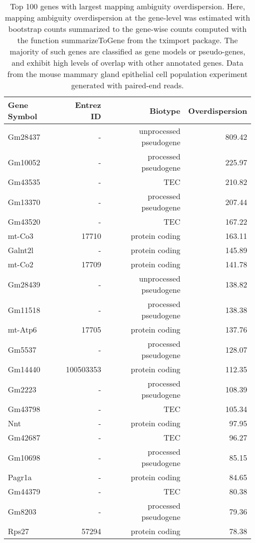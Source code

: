 \begingroup\fontsize{10}{12}\selectfont

\begin{longtable}[t]{lrrr}
\caption{Top 100 genes with largest mapping ambiguity overdispersion. Here, mapping ambiguity overdispersion at the gene-level was estimated with bootstrap counts summarized to the gene-wise counts computed with the function summarizeToGene from the tximport package. The majority of such genes are classified as gene models or pseudo-genes, and exhibit high levels of overlap with other annotated genes. Data from the mouse mammary gland epithelial cell population experiment generated with paired-end reads.}\\
\toprule
Gene Symbol & Entrez ID & Biotype & Overdispersion\\
\midrule
Gm28437 & - & unprocessed pseudogene & 809.42\\
Gm10052 & - & processed pseudogene & 225.97\\
Gm43535 & - & TEC & 210.82\\
Gm13370 & - & processed pseudogene & 207.44\\
Gm43520 & - & TEC & 167.22\\
\addlinespace
mt-Co3 & 17710 & protein coding & 163.11\\
Galnt2l & - & protein coding & 145.89\\
mt-Co2 & 17709 & protein coding & 141.78\\
Gm28439 & - & unprocessed pseudogene & 138.82\\
Gm11518 & - & processed pseudogene & 138.38\\
\addlinespace
mt-Atp6 & 17705 & protein coding & 137.76\\
Gm5537 & - & processed pseudogene & 128.07\\
Gm14440 & 100503353 & protein coding & 112.35\\
Gm2223 & - & processed pseudogene & 108.39\\
Gm43798 & - & TEC & 105.34\\
\addlinespace
Nnt & - & protein coding & 97.95\\
Gm42687 & - & TEC & 96.27\\
Gm10698 & - & processed pseudogene & 85.15\\
Pagr1a & - & protein coding & 84.65\\
Gm44379 & - & TEC & 80.38\\
\addlinespace
Gm8203 & - & processed pseudogene & 79.36\\
Rps27 & 57294 & protein coding & 78.38\\

\end{longtable}
